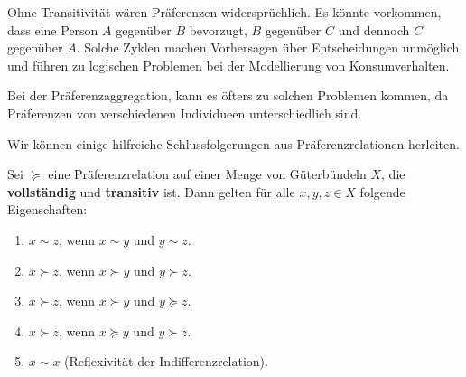 Ohne Transitivität wären Präferenzen widersprüchlich. Es könnte vorkommen, dass eine Person $A$ gegenüber $B$ bevorzugt, $B$ gegenüber $C$ und dennoch $C$ gegenüber $A$. Solche Zyklen machen Vorhersagen über Entscheidungen unmöglich und führen zu logischen Problemen bei der Modellierung von Konsumverhalten.
\begin{remark}
	Bei der Präferenzaggregation, kann es öfters zu solchen Problemen kommen, da Präferenzen von verschiedenen Individueen unterschiedlich sind.
\end{remark}
Wir können einige hilfreiche Schlussfolgerungen aus Präferenzrelationen herleiten.
\begin{proposition}
	Sei $\succeq$ eine Präferenzrelation auf einer Menge von Güterbündeln $X$, die \textbf{vollständig} und \textbf{transitiv} ist. Dann gelten für alle $x, y, z \in X$ folgende Eigenschaften:
	\begin{enumerate}
		\item $x \sim z$, wenn $x \sim y$ und $y \sim z$.
		\item $x \succ z$, wenn $x \succ y$ und $y \succ z$.
		\item $x \succ z$, wenn $x \succ y$ und $y \succeq z$.
		\item $x \succ z$, wenn $x \succeq y$ und $y \succ z$.
		\item $x \sim x$ (Reflexivität der Indifferenzrelation).
	\end{enumerate}
\end{proposition}

